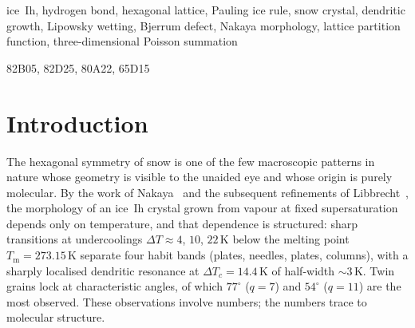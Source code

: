\documentclass[final]{siamltex}
\newcommand{\Tm}{T_{\mathrm{m}}}
\begin{document}
\begin{abstract}
The QLL coefficient $\xi$ is extracted from Lipowsky data via the
UNDERWOOD augmented-basis framework~\cite{Underwood2026}, which
provides Chebyshev-plus-log-companion approximation with proved
geometric convergence and a Walsh--Bernstein separation theorem
against rational alternatives.  The dendrite peak width, the QLL
coefficient, and the $q = 7$ twin angle agree with experiment to
$0.3\%$, $0.2\%$, and $0.8^{\circ}$ respectively.  The
fourth Nakaya habit band predicted at $-46^{\circ}$C and the
$+4.3^{\circ}$C D$_2$O dendrite shift are testable but not yet
measured.  All numerical values are reproducible from a single
Python script (\textasciitilde{}500 lines, numpy + mpmath); the
algebraic core is mechanically verified in Lean~4.
\end{abstract}

\begin{keywords}
ice~Ih, hydrogen bond, hexagonal lattice, Pauling ice rule, snow
crystal, dendritic growth, Lipowsky wetting, Bjerrum defect,
Nakaya morphology, lattice partition function, three-dimensional
Poisson summation
\end{keywords}

\begin{AMS}
82B05, 82D25, 80A22, 65D15
\end{AMS}

\pagestyle{myheadings}
\thispagestyle{plain}

\section{Introduction}

The hexagonal symmetry of snow is one of the few macroscopic
patterns in nature whose geometry is visible to the unaided eye
and whose origin is purely molecular.  By the work of
Nakaya~\cite{Nakaya1954} and the subsequent refinements of
Libbrecht~\cite{Libbrecht2005}, the morphology of an ice~Ih
crystal grown from vapour at fixed supersaturation depends only
on temperature, and that dependence is structured: sharp
transitions at undercoolings $\Delta T \approx 4$, $10$, $22$\,K
below the melting point $\Tm = 273.15$\,K separate four habit
bands (plates, needles, plates, columns), with a sharply localised
dendritic resonance at $\Delta T_c = 14.4$\,K of half-width
$\sim 3$\,K.  Twin grains lock at characteristic angles, of which
$77^{\circ}$ ($q = 7$) and $54^{\circ}$ ($q = 11$) are the most
observed.  These observations involve numbers; the numbers trace
to molecular structure.
\end{document}
